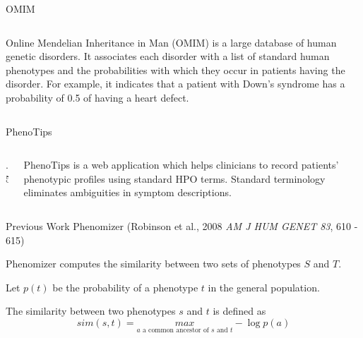 \documentclass[final]{beamer} %
\begin{document}
\begin{frame}{}
\begin{columns}[T]
\begin{column}{0.3\linewidth}
{\begin{block}{\Large OMIM}
\begin{columns}[T]
        \begin{column}{.5\textwidth}
          \Large Online Mendelian Inheritance in Man (OMIM) is a large
          database of human genetic disorders. It associates each
          disorder with a list of standard human phenotypes and the
          probabilities with which they occur in patients having the
          disorder. For example, it indicates that a patient with
          Down's syndrome has a probability of 0.5 of having a heart
          defect.
        \end{column}
      \end{columns}
    \end{block}

  

    \begin{block}{\Large PhenoTips}
      \begin{columns}[T]
        \begin{column} {.5\textwidth}
          \centering
        \end{column}
        
        \begin{column}{.5\textwidth}
          \Large PhenoTips is a web application which helps clinicians
          to record patients' phenotypic profiles using standard HPO
          terms. Standard terminology eliminates ambiguities in
          symptom descriptions.
        \end{column}
      \end{columns}

  \end{block}
  \vfill
  \begin{block}{\Huge Previous Work}
    \Large Phenomizer (Robinson et al., 2008 {\it{\Large AM J HUM
        GENET 83}}, 610 - 615)

    Phenomizer computes the similarity between two sets of phenotypes
    $S$ and $T$.

    Let $p(t)$ be the probability of a phenotype $t$ in the general
    population.

    The similarity between two phenotypes $s$ and $t$ is defined
    as\[sim(s,t) = \underset{a \text{ a common ancestor of $s$ and
        $t$}}{max} -\log p(a)\]


\end{block}}
\end{column}
\end{columns}
\end{frame}
\end{document}
